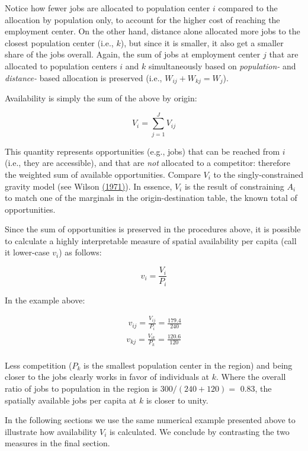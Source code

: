 \documentclass[]{elsarticle} %
\begin{document}
Notice how fewer jobs are allocated to population center \(i\) compared
to the allocation by population only, to account for the higher cost of
reaching the employment center. On the other hand, distance alone
allocated more jobs to the closest population center (i.e., \(k\)), but
since it is smaller, it also get a smaller share of the jobs overall.
Again, the sum of jobs at employment center \(j\) that are allocated to
population centers \(i\) and \(k\) simultaneously based on
\emph{population-} and \emph{distance-} based allocation is preserved
(i.e., \(W_{ij} + W_{kj} = W_j\)).

Availability is simply the sum of the above by origin:

\[
V_i = \sum_{j=1}^J V_{ij}
\]

This quantity represents opportunities (e.g., jobs) that can be reached
from \(i\) (i.e., they are accessible), and that are \emph{not}
allocated to a competitor: therefore the weighted sum of available
opportunities. Compare \(V_i\) to the singly-constrained gravity model
(see Wilson \href{https://doi.org/10.1068/a030001}{(1971)}). In essence,
\(V_i\) is the result of constraining \(A_i\) to match one of the
marginals in the origin-destination table, the known total of
opportunities.

Since the sum of opportunities is preserved in the procedures above, it
is possible to calculate a highly interpretable measure of spatial
availability per capita (call it lower-case \(v_i\)) as follows:

\[
v_i = \frac{V_i}{P_i}
\]

In the example above:

\[
\begin{array}{l}\
v_{ij} = \frac{V_{ij}}{P_i} =  \frac{179.4}{240}\\
v_{kj} =  \frac{V_{ik}}{P_k} =  \frac{120.6}{120}\\
\end{array}
\]

Less competition (\(P_k\) is the smallest population center in the
region) and being closer to the jobs clearly works in favor of
individuals at \(k\). Where the overall ratio of jobs to population in
the region is \(300/(240 + 120)=\) 0.83, the spatially available jobs
per capita at \(k\) is closer to unity.

In the following sections we use the same numerical example presented
above to illustrate how availability \(V_i\) is calculated. We conclude
by contrasting the two measures in the final section.
\end{document}
